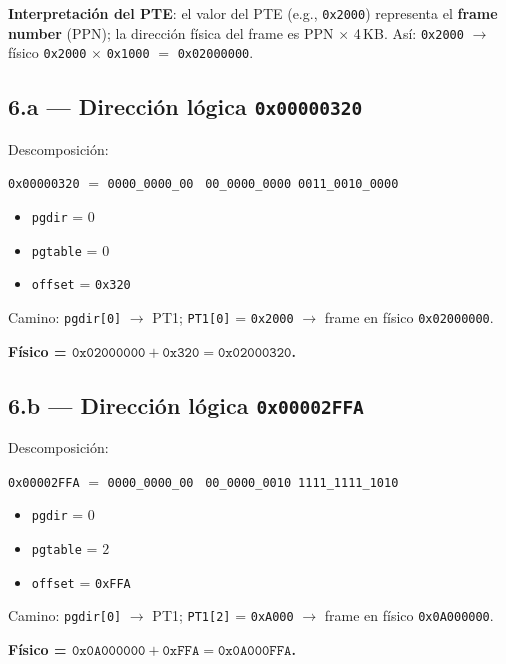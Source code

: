 \documentclass[11pt,a4paper]{article}
\begin{document}
\textbf{Interpretación del PTE}: el valor del PTE (e.g.,
\texttt{0x2000}) representa el \textbf{frame number} (PPN); la
dirección física del frame es PPN $\times$ 4\,KB. Así:
\texttt{0x2000} $\to$ físico \texttt{0x2000} $\times$
\texttt{0x1000} $=$ \texttt{0x02000000}.

\subsection*{6.a --- Dirección lógica \texttt{0x00000320}}

Descomposición:

\quad \texttt{0x00000320} $=$ \texttt{0000\_0000\_00}\ %
\texttt{00\_0000\_0000}\ \texttt{0011\_0010\_0000}

\begin{itemize}[leftmargin=*,nosep]
    \item \texttt{pgdir} = $0$
    \item \texttt{pgtable} = $0$
    \item \texttt{offset} = \texttt{0x320}
\end{itemize}

Camino: \texttt{pgdir[0]} $\to$ PT1; \texttt{PT1[0]} = \texttt{0x2000}
$\to$ frame en físico \texttt{0x02000000}.

\quad \textbf{Físico = $\texttt{0x02000000} + \texttt{0x320} =
\texttt{0x02000320}$.}

\subsection*{6.b --- Dirección lógica \texttt{0x00002FFA}}

Descomposición:

\quad \texttt{0x00002FFA} $=$ \texttt{0000\_0000\_00}\ %
\texttt{00\_0000\_0010}\ \texttt{1111\_1111\_1010}

\begin{itemize}[leftmargin=*,nosep]
    \item \texttt{pgdir} = $0$
    \item \texttt{pgtable} = $2$
    \item \texttt{offset} = \texttt{0xFFA}
\end{itemize}

Camino: \texttt{pgdir[0]} $\to$ PT1; \texttt{PT1[2]} = \texttt{0xA000}
$\to$ frame en físico \texttt{0x0A000000}.

\quad \textbf{Físico = $\texttt{0x0A000000} + \texttt{0xFFA} =
\texttt{0x0A000FFA}$.}
\end{document}
